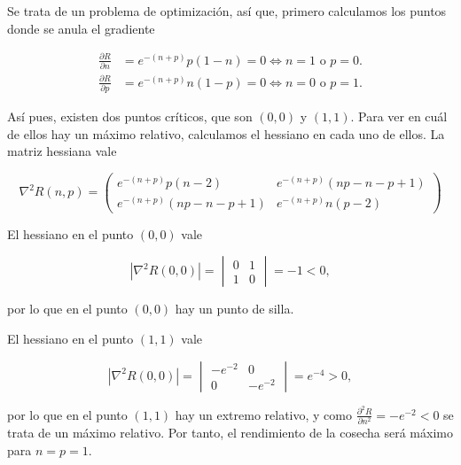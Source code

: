 \documentclass[
  spanish,
  a4paper,
]{scrreport}
\theoremstyle{definition}
\theoremstyle{remark}
\begin{document}
\begin{tcolorbox}[enhanced jigsaw, arc=.35mm, bottomrule=.15mm, bottomtitle=1mm, breakable, colback=white, colbacktitle=quarto-callout-tip-color!10!white, colframe=quarto-callout-tip-color-frame, coltitle=black, left=2mm, leftrule=.75mm, opacityback=0, opacitybacktitle=0.6, rightrule=.15mm, title=\textcolor{quarto-callout-tip-color}{\faLightbulb}\hspace{0.5em}{Solución}, titlerule=0mm, toprule=.15mm, toptitle=1mm]

Se trata de un problema de optimización, así que, primero calculamos los
puntos donde se anula el gradiente

\begin{align*}
\frac{\partial R}{\partial n} 
&= e^{-(n+p)}p(1-n) = 0 \Leftrightarrow n=1 \mbox{ o } p=0.\\
\frac{\partial R}{\partial p} 
&= e^{-(n+p)}n(1-p) = 0 \Leftrightarrow n=0 \mbox{ o } p=1.
\end{align*}

Así pues, existen dos puntos críticos, que son \((0,0)\) y \((1, 1)\).
Para ver en cuál de ellos hay un máximo relativo, calculamos el hessiano
en cada uno de ellos. La matriz hessiana vale

\[
\nabla^2 R(n,p) =
\begin{pmatrix}
e^{-(n+p)}p(n-2) & e^{-(n+p)}(np-n-p+1)\\
e^{-(n+p)}(np-n-p+1) & e^{-(n+p)}n(p-2)
\end{pmatrix}
\]

El hessiano en el punto \((0,0)\) vale

\[
|\nabla^2 R(0,0)| =
\begin{vmatrix}
0 & 1\\
1 & 0
\end{vmatrix}
= -1 < 0,
\]

por lo que en el punto \((0,0)\) hay un punto de silla.

El hessiano en el punto \((1,1)\) vale

\[
|\nabla^2 R(0,0)| =
\begin{vmatrix}
-e^{-2} & 0\\
0 & -e^{-2}
\end{vmatrix}
= e^{-4} > 0,
\]

por lo que en el punto \((1,1)\) hay un extremo relativo, y como
\(\frac{\partial^2 R}{\partial n^2}=-e^{-2} <0\) se trata de un máximo
relativo. Por tanto, el rendimiento de la cosecha será máximo para
\(n=p=1\).

\end{tcolorbox}
\end{document}
